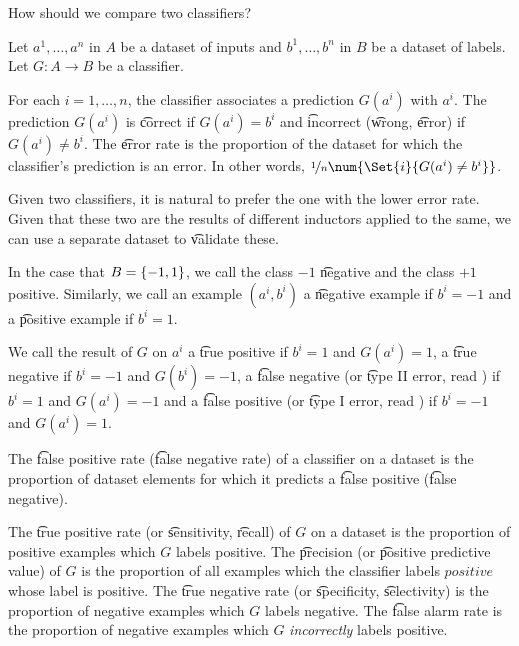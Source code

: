 
How should we compare two classifiers?

Let $a^1, \dots, a^n$ in $A$ be a dataset of inputs and $b^1, \dots, b^n$ in $B$ be a dataset of labels.
Let $G: A \to B$ be a classifier.

For each $i = 1, \dots, n$, the classifier associates a prediction $G(a^i)$ with $a^i$.
The prediction $G(a^i)$ is \t{correct} if $G(a^i) = b^i$ and \t{incorrect} (\t{wrong}, \t{error}) if $G(a^i) \neq b^i$.
The \t{error rate} is the proportion of the dataset for which the classifier's prediction is an error.
In other words, $\nicefrac{1}{n}\num{\Set{i}{G(a^i) \neq b^i}}$.

Given two classifiers, it is natural to prefer the one with the lower error rate.
Given that these two are the results of different inductors applied to the same, we can use a separate dataset to \t{validate} these.


In the case that $B = \{-1, 1\}$, we call the class $-1$ \t{negative} and the class $+1$ positive.
Similarly, we call an example $(a^i, b^i)$ a \t{negative example} if $b^i = -1$ and a \t{positive example} if $b^i = 1$.

We call the result of $G$ on $a^i$ a \t{true positive} if $b^i = 1$ and $G(a^i) = 1$, a \t{true negative} if $b^i = -1$ and $G(b^i) = -1$, a \t{false negative} (or \t{type II error}, read ) if $b^i = 1$ and $G(a^i) = -1$ and a \t{false positive} (or \t{type I error}, read ) if $b^i = -1$ and $G(a^i) = 1$.

The \t{false positive rate} (\t{false negative rate}) of a classifier on a dataset is the proportion of dataset elements for which it predicts a \t{false positive} (\t{false negative}).

The \t{true positive rate} (or \t{sensitivity}, \t{recall}) of $G$ on a dataset is the proportion of positive examples which $G$ labels positive.
The \t{precision} (or \t{positive predictive value}) of $G$ is the proportion of all examples which the classifier labels $positive$ whose label is positive.
The \t{true negative rate} (or \t{specificity}, \t{selectivity}) is the proportion of negative examples which $G$ labels negative.
The \t{false alarm rate} is the proportion of negative examples which $G$ \textit{incorrectly} labels positive.

\blankpage

